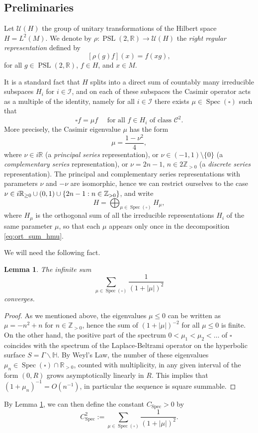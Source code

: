 \documentclass[10pt]{amsart}
\newcommand \R{\mathbb{R}}
\newcommand \Hbb{\mathbb{H}}
\newcommand \Z{\mathbb{Z}}
\DeclareMathOperator{\PSL}{PSL}
\DeclareMathOperator{\Spec}{Spec}
\newtheorem {lemma}[theorem]{Lemma}
\theoremstyle{definition}
\begin{document}
\subsection{Preliminaries}

Let $\mathcal{U}(H)$ the group of unitary transformations of the Hilbert space $H= L^2(M)$.
We denote by $\rho \colon \PSL(2,\R) \to \mathcal{U}(H)$ the \emph{right regular representation} defined by
\[
[\rho(g)f](x) = f(xg),
\]
for all $g \in \PSL(2,\R)$, $f \in H$, and $x \in M$.

It is a standard fact that $H$ splits into a direct sum of countably many irreducible subspaces $H_{i}$ for $i \in \mathcal{I}$, and on each of these subspaces the Casimir operator acts as a multiple of the identity, namely for all $i \in \mathcal{I}$ there exists $\mu \in \Spec(\square)$ such that
\[
\square f = \mu f \quad \text{ for all $f \in H_i$ of class $\mathscr{C}^2$}.
\]
More precisely, the Casimir eigenvalue $\mu$ has the form
\[
\mu = \frac{1-\nu^2}{4},
\]
where $\nu \in i\R$ (a \emph{principal series} representation), or $\nu \in (-1,1) \setminus \{0\}$ (a \emph{complementary series} representation), or $\nu = 2n-1$, $n \in 2\Z_{>0}$ (a \emph{discrete series} representation).
The principal and complementary series representations with parameters $\nu$ and $-\nu$ are isomorphic, hence we can restrict ourselves to the case $\nu \in i\R_{\geq 0} \cup (0,1) \cup\allowbreak \{ 2n-\nobreak 1 :\nobreak n \in\nobreak \Z_{>0}\}$, and write
\begin{equation}\label{eq:ort_sum_hmu}
H= \bigoplus_{\mu \in \Spec(\square)} H_{\mu},
\end{equation}
where $H_\mu$ is the orthogonal sum of all the irreducible representations $H_i$ of the same parameter $\mu$, so that each $\mu$ appears only once in the decomposition \eqref{eq:ort_sum_hmu}.

We will need the following fact.
\begin{lemma}\label{lemma:Weyl}
The infinite sum
\[
\sum_{\mu \in \Spec(\square)} \frac{1}{(1+|\mu|)^2}
\]
converges.
\end{lemma}
\begin{proof}
As we mentioned above, the eigenvalues $\mu \leq 0$ can be written as $\mu = -n^2+n$ for $n \in \Z_{>0}$, hence the sum of $(1+|\mu|)^{-2}$ for all $\mu\leq 0$ is finite.
On the other hand, the positive part of the spectrum $0<\mu_1 <\mu_2< \dots$ of $\square$ coincides with the spectrum of the Laplace-Beltrami operator on the hyperbolic surface $S =\Gamma \backslash \Hbb$. By Weyl's Law, the number of these eigenvalues $\mu_n \in \Spec(\square) \cap \R_{>0}$, counted with multiplicity, in any given interval of the form $(0,R)$ grows asymptotically linearly in $R$. This implies that $(1+\mu_n)^{-1} = O(n^{-1})$, in particular the sequence is square summable.
\end{proof}
By Lemma \ref{lemma:Weyl}, we can then define the constant $C_{\Spec}>0$ by
\[
C^2_{\Spec}:=\sum_{\mu \in \Spec(\square)} \frac{1}{(1+|\mu|)^2}.
\]
\end{document}
